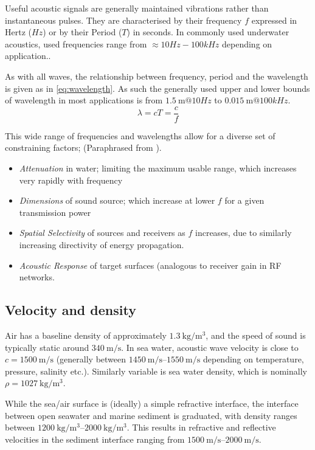 Useful acoustic signals are generally maintained vibrations rather than instantaneous pulses.
They are characterised by their frequency $f$ expressed in Hertz ($Hz$) or by their Period ($T$) in seconds.
In commonly used underwater acoustics, used frequencies range from $\approx 10Hz-100kHz$ depending on application.\cite{Stojanovic2007}.

As with all waves, the relationship between frequency, period and the wavelength is given as in \eqref{eq:wavelength}. 
As such the generally used upper and lower bounds of wavelength in most applications is from $\SI{1.5}{\meter} @ 10Hz$ to $\SI{0.015}{\meter} @ 100kHz$.
%
\begin{equation}
  \lambda = cT = \frac{c}{f}
  \label{eq:wavelength}
\end{equation}
%

This wide range of frequencies and wavelengths allow for a diverse set of constraining factors; (Paraphrased from \citet{lurton2010}).

\begin{itemize}
  \item \emph{Attenuation} in water; limiting the maximum usable range, which increases very rapidly with frequency
  \item \emph{Dimensions} of sound source; which increase at lower $f$ for a given transmission power
  \item \emph{Spatial Selectivity} of sources and receivers as $f$ increases, due to similarly increasing directivity of energy propagation.
  \item \emph{Acoustic Response} of target surfaces (analogous to receiver gain in RF networks.
\end{itemize}

\subsection{Velocity and density}

Air has a baseline density of approximately $\SI{1.3}{\kilogram\per\meter\cubed}$, and the speed of sound is typically static around $\SI{340}{\meter\per\second}$.
In sea water, acoustic wave velocity is close to $c=\SI{1500}{\meter\per\second}$ (generally between $\SIrange{1450}{1550}{\meter\per\second}$ depending on temperature, pressure, salinity etc.).
Similarly variable is sea water density, which is nominally $\rho = \SI{1027}{\kilogram\per\meter\cubed}$\cite{Wang2010}.

While the sea/air surface is (ideally) a simple refractive interface, the interface between open seawater and marine sediment is graduated, with density ranges between $\SIrange{1200}{2000}{\kilogram\per\meter\cubed}$. 
This results in refractive and reflective velocities in the sediment interface ranging from $\SIrange{1500}{2000}{\meter\per\second}$\cite{lurton2010}.


